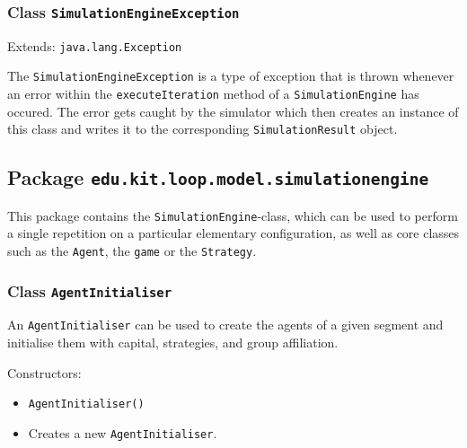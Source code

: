 \documentclass[parskip=full,11pt]{scrartcl}
\begin{document}
\subsubsection{Class \texttt{SimulationEngineException}}
Extends: \texttt{java.lang.Exception}

The \texttt{SimulationEngineException} is a type of exception that is thrown whenever an error within the \texttt{executeIteration} method of a \texttt{SimulationEngine} has occured. The error gets caught by the simulator which then creates an instance of this class and writes it to the corresponding \texttt{SimulationResult} object.

\subsection{Package \texttt{edu.kit.loop.model.simulationengine}}


This package contains the \texttt{SimulationEngine}-class, which can be used to perform a single repetition on a particular elementary configuration, as well as core classes such as the \texttt{Agent}, the \texttt{game} or the \texttt{Strategy}.

\subsubsection{Class \texttt{AgentInitialiser}}
An \texttt{AgentInitialiser} can be used to create the agents of a given segment and initialise them with capital, strategies, and group affiliation.

Constructors:
\begin{itemize}\itemsep -10pt
\item \texttt{AgentInitialiser()}
\item[] Creates a new \texttt{AgentInitialiser}.
\end{itemize}
\end{document}
